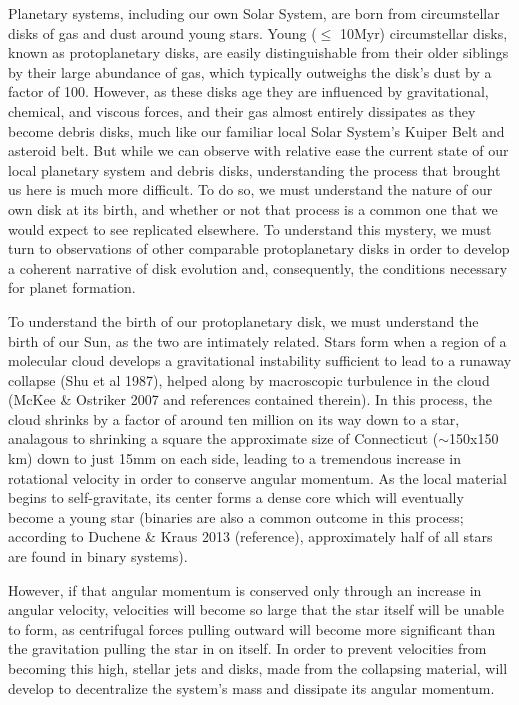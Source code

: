 Planetary systems, including our own Solar System, are born from circumstellar disks of gas and dust around young stars. Young ($\leq$ 10Myr) circumstellar disks, known as protoplanetary disks, are easily distinguishable from their older siblings by their large abundance of gas, which typically outweighs the disk's dust by a factor of 100. However, as these disks age they are influenced by gravitational, chemical, and viscous forces, and their gas almost entirely dissipates as they become debris disks, much like our familiar local Solar System's Kuiper Belt and asteroid belt. But while we can observe with relative ease the current state of our local planetary system and debris disks, understanding the process that brought us here is much more difficult. To do so, we must understand the nature of our own disk at its birth, and whether or not that process is a common one that we would expect to see replicated elsewhere. To understand this mystery, we must turn to observations of other comparable protoplanetary disks in order to develop a coherent narrative of disk evolution and, consequently, the conditions necessary for planet formation.

To understand the birth of our protoplanetary disk, we must understand the birth of our Sun, as the two are intimately related. Stars form when a region of a molecular cloud develops a gravitational instability sufficient to lead to a runaway collapse (Shu et al 1987), helped along by macroscopic turbulence in the cloud (McKee \& Ostriker 2007 and references contained therein). In this process, the cloud shrinks by a factor of around ten million on its way down to a star, analagous to shrinking a square the approximate size of Connecticut ($\sim$150x150 km) down to just 15mm on each side, leading to a tremendous increase in rotational velocity in order to conserve angular momentum. As the local material begins to self-gravitate, its center forms a dense core which will eventually become a young star (binaries are also a common outcome in this process; according to Duchene \& Kraus 2013 (reference), approximately half of all stars are found in binary systems).

However, if that angular momentum is conserved only through an increase in angular velocity, velocities will become so large that the star itself will be unable to form, as centrifugal forces pulling outward will become more significant than the gravitation pulling the star in on itself. In order to prevent velocities from becoming this high, stellar jets and disks, made from the collapsing material, will develop to decentralize the system's mass and dissipate its angular momentum.

